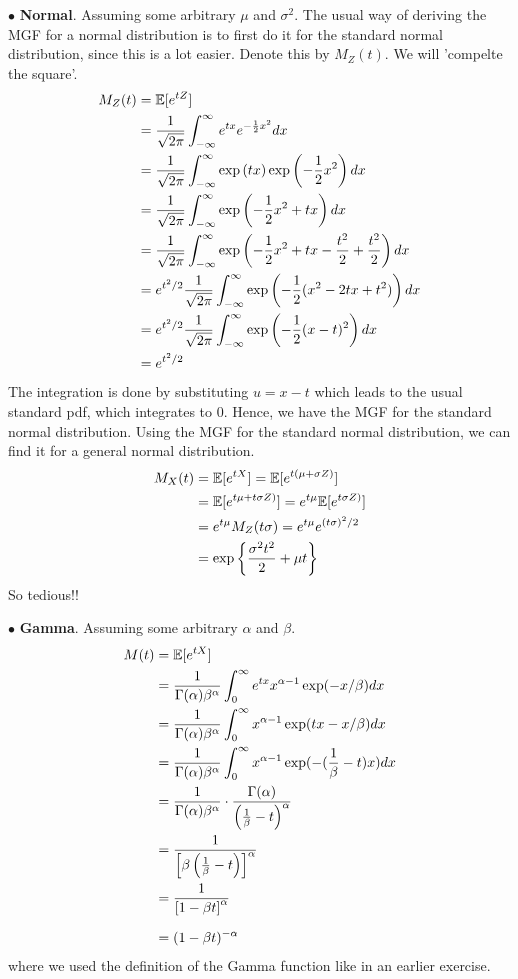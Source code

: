 \bigskip\noindent$\bullet$ \textbf{Normal}. Assuming some arbitrary $\mu$ and $\sigma^2$.
The usual way of deriving the MGF for a normal distribution is to first do it for
the standard normal distribution, since this is a lot easier. Denote this by $M_Z(t)$.
We will 'compelte the square'.
\begin{align*}
    M_Z(t) &= \mathbb{E}[e^{tZ}] \\
    &= \frac{1}{\sqrt{2\pi}}\int_{-\infty}^\infty e^{tx}e^{-\frac{1}{2}x^2}dx \\
    &= \frac{1}{\sqrt{2\pi}}\int_{-\infty}^\infty \exp\left(tx\right)\exp\left(-\frac{1}{2}x^2\right)dx\\
    &= \frac{1}{\sqrt{2\pi}}\int_{-\infty}^\infty \exp\left(-\frac{1}{2}x^2 + tx\right)dx\\
    &= \frac{1}{\sqrt{2\pi}}\int_{-\infty}^\infty \exp\left(-\frac{1}{2}x^2 + tx - \frac{t^2}{2} + \frac{t^2}{2} \right)dx\\
    &= e^{t^2/2}\frac{1}{\sqrt{2\pi}}\int_{-\infty}^\infty \exp\left(-\frac{1}{2}(x^2 - 2tx + t^2)\right)dx \\
    &= e^{t^2/2}\frac{1}{\sqrt{2\pi}}\int_{-\infty}^\infty \exp\left(-\frac{1}{2}(x - t)^2\right)dx \\
    &= e^{t^2/2}
\end{align*}
The integration is done by substituting $u = x-t$ which leads to the usual standard pdf, which
integrates to 0. Hence, we have the MGF for the standard normal distribution. Using the
MGF for the standard normal distribution, we can find it for a general normal distribution.
\begin{align*}
    M_X(t) &= \mathbb{E}[e^{tX}]
    = \mathbb{E}[e^{t(\mu + \sigma Z)}] \\
    &= \mathbb{E}[e^{t\mu + t\sigma Z)}]
    = e^{t\mu}\mathbb{E}[e^{t\sigma Z)}]\\
    &= e^{t\mu}M_Z(t\sigma) = e^{t\mu}e^{(t\sigma)^2/2} \\
    &= \exp\left\{\frac{\sigma^2 t^2}{2} + \mu t\right\}
\end{align*}
So tedious!!

\newpage\noindent
$\bullet$ \textbf{Gamma}. Assuming some arbitrary $\alpha$ and $\beta$.
\begin{align*}
    M(t) &= \E[e^{tX}] \\
    &= \frac{1}{\Gamma(\alpha)\beta^\alpha}\int_{0}^\infty e^{tx}x^{\alpha-1}\exp(-x/\beta)dx \\
    &= \frac{1}{\Gamma(\alpha)\beta^\alpha}\int_{0}^\infty x^{\alpha-1}\exp(tx-x/\beta)dx \\
    &= \frac{1}{\Gamma(\alpha)\beta^\alpha}\int_{0}^\infty x^{\alpha-1}\exp(-(\frac{1}{\beta} - t)x)dx \\
    &= \frac{1}{\Gamma(\alpha)\beta^\alpha}\cdot \frac{\Gamma(\alpha)}{\left(\frac{1}{\beta} - t\right)^\alpha} \\
    &= \frac{1}{\left[\beta\left(\frac{1}{\beta} - t\right)\right]^\alpha} \\
    &= \frac{1}{\left[1 - \beta t\right]^\alpha} \\ 
    &= \rule{0pt}{15pt}(1-\beta t)^{-\alpha}
\end{align*}
where we used the definition of the Gamma function like in an earlier exercise.

